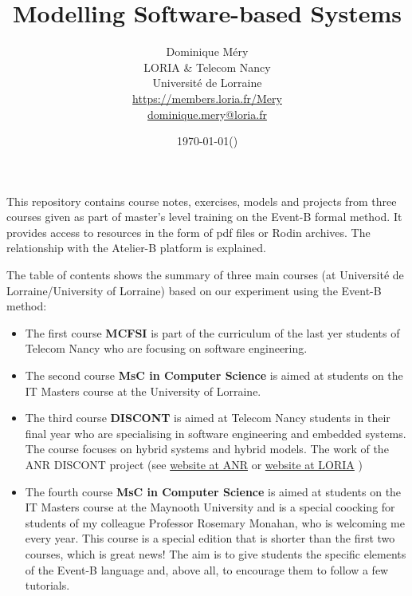 \documentclass[ 12pt]{article}
\title{Modelling Software-based Systems}
\author{Dominique M\'ery\\
LORIA \& Telecom Nancy\\ Universit\'e de Lorraine\\
\url{https://members.loria.fr/Mery}\\ \url{dominique.mery@loria.fr}}
\date{\today (\now)}
\begin{document}
  \setcounter{ex}{1}
\maketitle

This repository contains course notes, exercises, models and projects
from three courses given as part of master's level training on the
Event-B formal method. It provides access to resources in the form of
pdf files or Rodin archives. The relationship with the Atelier-B
platform is explained.

The table
of contents shows the  summary of three main courses (at Université de 
 Lorraine/University of Lorraine)  based on our
experiment using the  Event-B method:
\begin{itemize}


  
\item
    
    The first course \textbf{MCFSI} is part of the curriculum of the last yer
  students of Telecom Nancy  who are  focusing on software
  engineering.
\item  The second course  \textbf{MsC in Computer Science} is aimed at students on the IT Masters course
  at the University of Lorraine.
\item  The third course \textbf{DISCONT} is aimed at Telecom Nancy students in their final year who are specialising in software engineering and embedded systems. The course focuses on hybrid systems and hybrid models. The work of the ANR DISCONT project (see 
\href{https://anr.fr/Projet-ANR-17-CE25-0005}{
   website at ANR} or  \href{https://discont.loria.fr}{  website at
   LORIA} )

 
\item The fourth course  \textbf{MsC in Computer Science} is aimed at students on the IT Masters course 
  at the Maynooth  University   and is a special coocking for students 
  of my colleague Professor Rosemary Monahan, who is welcoming me every 
  year. This course is a special edition that is shorter than the first two courses, which is great news! The aim is to give students the specific elements of the Event-B language and, above all, to encourage them to follow a few tutorials.  

 \end{itemize}
\end{document}
